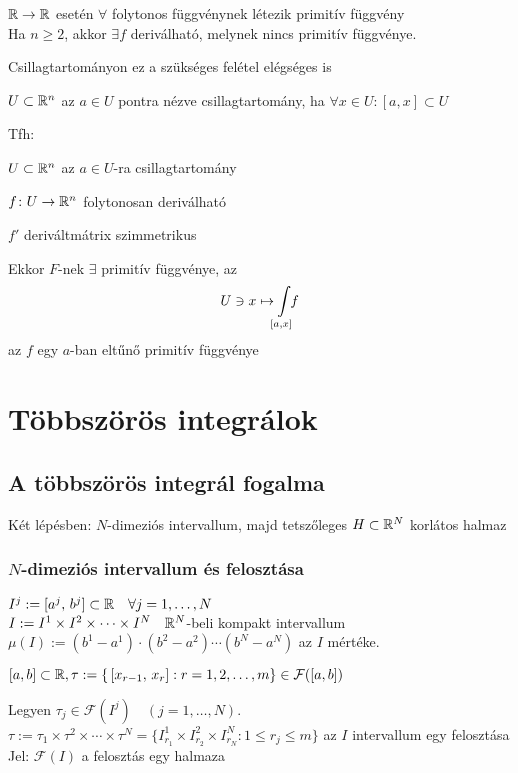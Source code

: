 \begin{Megj}
\item $\mathbb{R}\to\mathbb{R}$ esetén $\forall$ folytonos függvénynek létezik primitív függvény\\
  Ha $n\geq 2$, akkor $\exists f$ deriválható, melynek nincs primitív függvénye.
\item Csillagtartományon ez a szükséges felétel elégséges is
\end{Megj}

\begin{de}[Csillagtartomány]
  $U\subset \mathbb{R}^n$ az $a\in U$ pontra nézve csillagtartomány, ha $\forall x\in U: [a,x]\subset U$
\end{de}

\begin{te}
  Tfh:
  \begin{enumzjr}
  \item $U\subset \mathbb{R}^n$ az $a\in U$-ra csillagtartomány
  \item $f\colon U\to\mathbb{R}^n$ folytonosan deriválható
  \item $f'$ deriváltmátrix szimmetrikus
  \end{enumzjr}
  Ekkor $F$-nek $\exists$ primitív függvénye, az
  \[\di U\owns x\mapsto\!\!\Int_{[a,x]}\!\!\!f\]
  az  $f$ egy $a$-ban eltűnő primitív függvénye
\end{te}


\newpage
\section{Többszörös integrálok}
\subsection{A többszörös integrál fogalma}
Két lépésben: $N$-dimeziós intervallum, majd tetszőleges $H\subset\mathbb{R}^N$ korlátos halmaz

\subsubsection{$N$-dimeziós intervallum és felosztása}
\begin{de}
  $I^j:=[a^j,\,b^j]\subset \mathbb{R}\quad \forall j=1,\dotsc,N$\\
  $I := I^1\times I^2\times\dotsb\times I^N\quad\mathbb{R}^N$-beli kompakt intervallum\\
  $\mu(I) := (b^1-a^1)\cdot (b^2-a^2)\dotsm(b^N-a^N)$ az $I$ mértéke.
\end{de}
\begin{de}
  $[a,b]\subset \mathbb{R},\\\tau := \{\,[x_{r-1},\,x_r]:r=1,2,\dotsc,m\}\in\mathcal{F}([a,b])$
\end{de}
\begin{de}[Felosztás]
  Legyen $\tau_j\in\mathcal{F}(I^j)\quad (j=1,\dotsc,N)$.\\
  $\tau := \tau_1\times\tau^2\times\dotsb\times\tau^N=\{I^1_{r_1}\times I_{r_2}^2\times I^N_{r_N}:1\leq r_j\leq m\}$ az
  $I$ intervallum egy felosztása\\
  Jel: $\mathcal{F}(I)$ a felosztás egy halmaza
\end{de}

